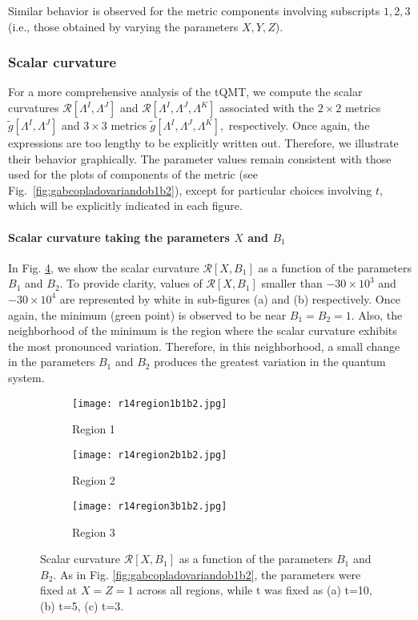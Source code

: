 \documentclass[12pt]{iopart}
\begin{document}
Similar behavior is observed for the metric components involving subscripts $1,2,3$ (i.e., those obtained by varying the parameters $X, Y, Z$).




\subsubsection{Scalar curvature}

For a more comprehensive analysis of the tQMT, we compute the scalar curvatures $\mathcal{R}[\Lambda^{I},\Lambda^{J}]$ and $\mathcal{R}[\Lambda^{I},\Lambda^{J},\Lambda^{K}]$ associated with the $2\times 2$ metrics $\tilde{g}[\Lambda^I,\Lambda^J]$ and $3\times 3$ metrics  $\tilde{g}[\Lambda^I,\Lambda^J,\Lambda^K],$ respectively. Once again, the expressions are too lengthy to be explicitly written out. Therefore, we illustrate their behavior graphically. The parameter values remain consistent with those used for the plots of components of the metric (see Fig.~\ref{fig:gabcopladovariandob1b2}), except for particular choices involving $t$, which will be explicitly indicated in each figure.

\paragraph{Scalar curvature taking the parameters $X$ and $B_1$ \newline}

In Fig. \ref{fig:R14b1b2}, we show the scalar curvature $\mathcal{R}[X, B_1]$  as a function of the parameters $B_1$ and $B_2$. To provide clarity, values of $\mathcal{R}[X, B_1]$ smaller than $-30\times 10^3$ and $-30\times 10^4$ are represented by white in sub-figures (a) and (b) respectively. Once again, the minimum (green point) is observed to be near $B_1=B_2=1$. Also, the neighborhood of the minimum is the region where the scalar curvature exhibits the most pronounced variation. Therefore, in this neighborhood, a small change in the parameters $B_1$ and $B_2$ produces the greatest variation in the quantum system. 


\begin{figure}[H]
  \centering
  \begin{subfigure}{0.45\linewidth}{\texttt{[image: r14region1b1b2.jpg]}}
    \caption{Region 1}
    \label{fig:R14b1b2a}
  \end{subfigure}
  \begin{subfigure}{0.45\linewidth}\texttt{[image: r14region2b1b2.jpg]}
    \caption{Region 2}
    \label{fig:R14b1b2b}  
  \end{subfigure}
   \begin{subfigure}{0.45\linewidth}\texttt{[image: r14region3b1b2.jpg]}
    \caption{Region 3}
    \label{fig:R14b1b2c}  
  \end{subfigure}
  \captionsetup{font=small} 
  \caption{\justifying Scalar curvature $\mathcal{R}[X, B_1]$  as a function of the parameters $B_1$ and $B_2$. As in Fig. \ref{fig:gabcopladovariandob1b2}, the parameters were fixed at $X=Z=1$ across all regions, while t was fixed as  (a) t=10, (b) t=5, (c) t=3. }    \label{fig:R14b1b2}
\end{figure}
\end{document}
